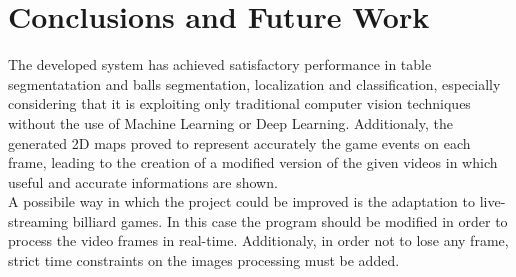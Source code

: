 \section{Conclusions and Future Work}


The developed system has achieved satisfactory performance in table segmentatation and balls segmentation, localization and classification, 
especially considering that it is exploiting only traditional computer vision techniques without the use of Machine Learning or Deep Learning.
Additionaly, the generated 2D maps proved to represent accurately the game events on each frame, leading to the creation of a modified version
of the given videos in which useful and accurate informations are shown. 
\newline \\
A possibile way in which the project could be improved is the adaptation to live-streaming billiard games. In this case the program should be modified
in order to process the video frames in real-time. Additionaly, in order not to lose any frame, strict time constraints on the images processing must be added. 